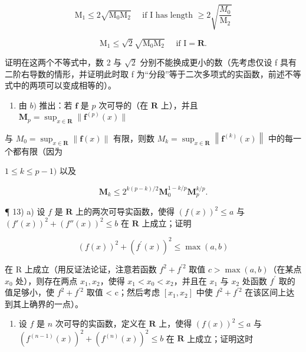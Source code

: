 \[
\mathrm{M} _ {1} \leqslant 2 \sqrt {\mathrm{M} _ {0} \mathrm{M} _ {2}} \quad \text { if   I   has   length } \geqslant 2 \sqrt {\frac {M _ {0}}{\mathrm{M} _ {2}}}
\]

\[
\mathrm{M} _ {1} \leqslant \sqrt {2} \sqrt {\mathrm{M} _ {0} \mathrm{M} _ {2}} \quad \text { if } \mathrm{I} = \mathbf {R}.
\]

证明在这两个不等式中，数 2 与 \(\sqrt{2}\) 分别不能换成更小的数（先考虑仅设 f 具有二阶右导数的情形，并证明此时取 f 为“分段”等于二次多项式的实函数，前述不等式中的两项可以变成相等的）。

\begin{enumerate}
\def\labelenumi{\alph{enumi})}
\setcounter{enumi}{2}
\tightlist
\item
  由 \(b)\) 推出：若 \(\mathbf{f}\) 是 \(p\) 次可导的（在 \(\mathbf{R}\) 上），并且 \(\mathbf{M}_p = \sup_{x \in \mathbf{R}} \| \mathbf{f}^{(p)}(x) \|\)
\end{enumerate}

与 \(M_{0}=\sup_{x\in\mathbf{R}}\|\mathbf{f}(x)\|\) 有限，则数 \(M_{k}=\sup_{x\in\mathbf{R}}\left\|\mathbf{f}^{(k)}(x)\right\|\) 中的每一个都有限（因为

\(1 \leqslant k \leqslant p - 1)\) 以及

\[
\mathbf {M} _ {k} \leqslant 2 ^ {k (p - k) / 2} \mathbf {M} _ {0} ^ {1 - k / p} \mathbf {M} _ {p} ^ {k / p}.
\]

¶ 13) a) 设 \(f\) 是 \(\mathbf{R}\) 上的两次可导实函数，使得 \((f(x))^2 \leqslant a\) 与 \((f'(x))^2 + (f''(x))^2 \leqslant b\) 在 \(\mathbf{R}\) 上成立；证明

\[
(f (x)) ^ {2} + \left(f ^ {\prime} (x)\right) ^ {2} \leqslant \max (a, b)
\]

在 R 上成立（用反证法论证，注意若函数 \(f^{2}+f^{\prime2}\) 取值 \(c > \max(a, b)\)（在某点 \(x_{0}\) 处），则存在两点 \(x_{1}, x_{2}\)，使得 \(x_{1} < x_{0} < x_{2}\)，并且在 \(x_{1}\) 与 \(x_{2}\) 处函数 \(f^{\prime}\) 取的值足够小，使 \(f^{2} + f^{\prime2}\) 取值 \textless{} c；然后考虑 \([x_{1}, x_{2}]\) 中使 \(f^{2} + f^{\prime2}\) 在该区间上达到其上确界的一点）。

\begin{enumerate}
\def\labelenumi{\alph{enumi})}
\setcounter{enumi}{1}
\tightlist
\item
  设 \(f\) 是 \(n\) 次可导的实函数，定义在 \(\mathbf{R}\) 上，使得 \((f(x))^2 \leqslant a\) 与 \((f^{(n - 1)}(x))^2 + (f^{(n)}(x))^2 \leqslant b\) 在 \(\mathbf{R}\) 上成立；证明这时
\end{enumerate}

